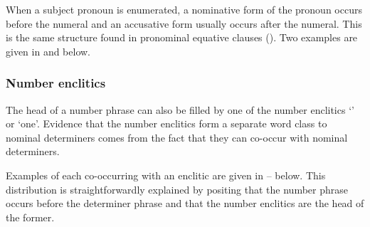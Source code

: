 When a subject pronoun is enumerated,
a nominative form of the pronoun occurs before the numeral
and an accusative form usually occurs after the numeral.
This is the same structure found in pronominal equative clauses ().
Two examples are given in  and  below.

\begin{exe}
	\label{ex:130909-6, 3.39}
	\label{ex:Mark 16:3--4}
\end{exe}

\subsubsection{Number enclitics}\label{sec:NumEnc sec:OthNomMod}
The head of a number phrase can also be filled by one of the number enclitics
 `{\ein}' or  `one'.
Evidence that the number enclitics form a separate word class to nominal
determiners comes from the fact that they can co-occur with nominal determiners.

Examples of each co-occurring with an enclitic
are given in -- below.
This distribution is straightforwardly explained by positing that the number phrase
occurs before the determiner phrase and that the number enclitics
are the head of the former.

